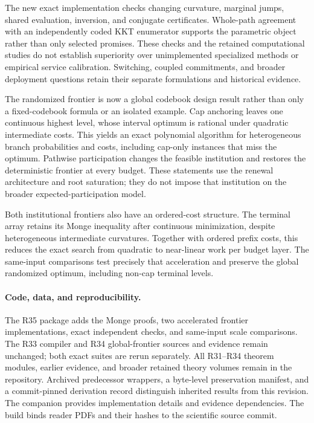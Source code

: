 \documentclass[11pt,letterpaper]{article}
\theoremstyle{definition}\newtheorem{assumption}[theorem]{Assumption}
\begin{document}
The new exact implementation checks changing curvature, marginal jumps, shared evaluation, inversion, and conjugate certificates. Whole-path agreement with an independently coded KKT enumerator supports the parametric object rather than only selected promises. These checks and the retained computational studies do not establish superiority over unimplemented specialized methods or empirical service calibration. Switching, coupled commitments, and broader deployment questions retain their separate formulations and historical evidence.

The randomized frontier is now a global codebook design result rather than only a fixed-codebook formula or an isolated example. Cap anchoring leaves one continuous highest level, whose interval optimum is rational under quadratic intermediate costs. This yields an exact polynomial algorithm for heterogeneous branch probabilities and costs, including cap-only instances that miss the optimum. Pathwise participation changes the feasible institution and restores the deterministic frontier at every budget. These statements use the renewal architecture and root saturation; they do not impose that institution on the broader expected-participation model.

Both institutional frontiers also have an ordered-cost structure. The terminal array retains its Monge inequality after continuous minimization, despite heterogeneous intermediate curvatures. Together with ordered prefix costs, this reduces the exact search from quadratic to near-linear work per budget layer. The same-input comparisons test precisely that acceleration and preserve the global randomized optimum, including non-cap terminal levels.

\paragraph{Code, data, and reproducibility.}
The R35 package adds the Monge proofs, two accelerated frontier implementations, exact independent checks, and same-input scale comparisons. The R33 compiler and R34 global-frontier sources and evidence remain unchanged; both exact suites are rerun separately. All R31--R34 theorem modules, earlier evidence, and broader retained theory volumes remain in the repository. Archived predecessor wrappers, a byte-level preservation manifest, and a commit-pinned derivation record distinguish inherited results from this revision. The companion provides implementation details and evidence dependencies. The build binds reader PDFs and their hashes to the scientific source commit.
\clearpage
{}\label{r35-refs-start}

\label{r35-refs-end}
\clearpage




\end{document}
